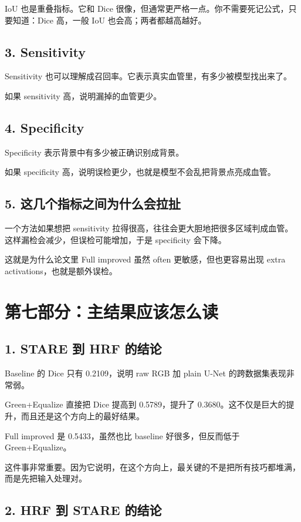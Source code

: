 \documentclass[12pt,a4paper]{ctexart}
\begin{document}
IoU 也是重叠指标。它和 Dice 很像，但通常更严格一点。你不需要死记公式，只要知道：Dice 高，一般 IoU 也会高；两者都越高越好。

\subsection*{3. Sensitivity}

Sensitivity 也可以理解成召回率。它表示真实血管里，有多少被模型找出来了。

如果 sensitivity 高，说明漏掉的血管更少。

\subsection*{4. Specificity}

Specificity 表示背景中有多少被正确识别成背景。

如果 specificity 高，说明误检更少，也就是模型不会乱把背景点亮成血管。

\subsection*{5. 这几个指标之间为什么会拉扯}

一个方法如果想把 sensitivity 拉得很高，往往会更大胆地把很多区域判成血管。这样漏检会减少，但误检可能增加，于是 specificity 会下降。

这就是为什么论文里 Full improved 虽然 often 更敏感，但也更容易出现 extra activations，也就是额外误检。

\section*{第七部分：主结果应该怎么读}

\subsection*{1. STARE 到 HRF 的结论}

Baseline 的 Dice 只有 0.2109，说明 raw RGB 加 plain U-Net 的跨数据集表现非常弱。

Green+Equalize 直接把 Dice 提高到 0.5789，提升了 0.3680。这不仅是巨大的提升，而且还是这个方向上的最好结果。

Full improved 是 0.5433，虽然也比 baseline 好很多，但反而低于 Green+Equalize。

这件事非常重要。因为它说明，在这个方向上，最关键的不是把所有技巧都堆满，而是先把输入处理对。

\subsection*{2. HRF 到 STARE 的结论}
\end{document}
